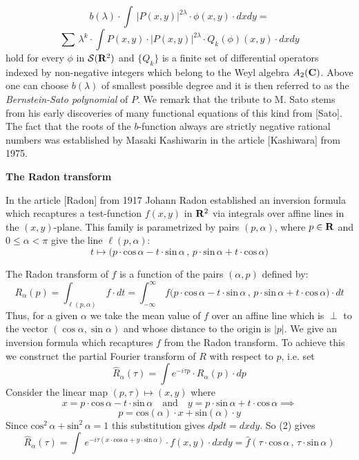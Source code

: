 \[
b(\lambda)\cdot\int\,|P(x,y)|^{2\lambda}\cdot\phi(x,y)\cdot dxdy
=
\] 
\[
\sum\,\lambda^k
\cdot\int P(x,y)\cdot |P(x,y)|^{2\lambda}\cdot Q_k(\phi)(x,y)\cdot dxdy
\]
hold for every $\phi$ in $\mathcal S({\bf{R}}^2)$
and  $\{Q_k\}$ is a finite set of differential operators 
indexed by non-negative integers
which  belong 
to the Weyl algebra $A_2({\bf{C}})$.
Above one can choose $b(\lambda)$ of smallest possible degree and it is then
referred
to as the \emph{Bernstein-Sato polynomial} of $P$.
We remark that the tribute to M. Sato stems from his early
discoveries of many functional equations of this kind from
[Sato].
The fact that the 
roots of the $b$-function always are strictly negative rational numbers was
established by Masaki Kashiwarin in the article [Kashiwara] from 1975.
















\bigskip





\centerline{\bf \large The Radon transform}

\bigskip

\noindent
In the article  [Radon] from 1917
Johann Radon 
established  an inversion formula which recaptures 
a  test-function $f(x,y)$ in ${\bf{R}}^2$
via   integrals over  affine lines
in the
$(x,y)$-plane. This family 
is parametrized by pairs $(p,\alpha)$,
where  $p\in{\bf{R}}$ and $0\leq \alpha<\pi$
give  the line
$\ell(p,\alpha)$:
\[
 t\mapsto 
 \bigl(p\cdot \text{cos}\,\alpha-
 t\cdot \text{sin}\,\alpha\, , \,p\cdot \text{sin}\,\alpha+
 t\cdot \text{cos}\,\alpha\bigr)
 \]


\noindent
The Radon  transform of $f$ is a function of the pairs $(\alpha,p)$
defined by:
\[
R_\alpha(p)=\int_{\ell(p,\alpha)}\,f\cdot dt=
\int_{-\infty}^\infty\, 
f\bigl(p\cdot \text{cos}\,\alpha-
t\cdot \text{sin}\,\alpha\, , \,p\cdot \text{sin}\,\alpha+
 t\cdot \text{cos}\,\alpha\bigr)
\cdot dt\tag{*}
 \]
Thus, for a given $\alpha$ we  take the mean value of $f$ over an affine line
which is $\perp$ to the vector $(\cos\alpha,\sin\alpha)$ and 
whose distance to the origin is $|p|$.
We give
an inversion formula which recaptures $f$ from the Radon transform.
To achieve this
we construct the partial  Fourier transform
of $R$ with respect to $p$, i.e. set
\[
 \widehat R_\alpha( \tau)=\int e^{-i\tau p}\cdot R_\alpha(p)\cdot dp\tag{1}
 \]
Consider the linear map
$(p,\tau)\mapsto (x,y)$ where
\[
x= p\cdot \text{cos}\,\alpha-
t\cdot  \text{sin}\,\alpha\quad\text{and}\quad
y=p\cdot \text{sin}\,\alpha+t\cdot \text{cos}\,\alpha\implies
\]
\[
p=\text{cos}(\alpha)\cdot x+
\text{sin}(\alpha)\cdot y\tag{2}
\]
Since  
$ \text{cos}^2\,\alpha+\text{sin}^2\,\alpha=1$ this substitution gives
$dpdt=dxdy$. So
(2) gives
\[
 \widehat R_\alpha(\tau)=
\int\, e^{-i\tau(x\cdot \text{cos}\,\alpha+
y\cdot \text{sin}\,\alpha)}
\cdot f(x,y)\cdot dxdy=
\widehat f(\tau\cdot \text{cos}\,\alpha\,,\,
\tau\cdot \text{sin}\,\alpha)\tag{3}
\]


